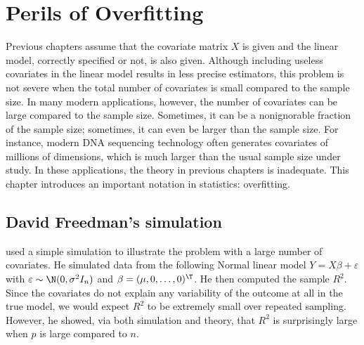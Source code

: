  
\chapter{Perils of Overfitting}
 


Previous chapters assume that the covariate matrix $X$ is given and the linear model, correctly specified or not, is also given. Although including useless covariates in the linear model results in less precise estimators, this problem is not severe when the total number of covariates is small compared to the sample size. In many modern applications, however, the number of covariates can be large compared to the sample size. Sometimes, it can be a nonignorable fraction of the sample size; sometimes, it can even be larger than the sample size. For instance, modern DNA sequencing technology often generates covariates of millions of dimensions, which is much larger than the usual sample size under study. In these applications, the theory in previous chapters is inadequate. This chapter introduces an important notation in statistics: overfitting. 



\section{David Freedman's simulation}

\citet{freedman1983note} used a simple simulation to illustrate the problem with a large number of covariates. 
He simulated data from the following Normal linear model $Y=X\beta+\varepsilon$
with $\varepsilon\sim\N(0,\sigma^{2}I_{n})$ and $\beta=(\mu,0,\ldots,0)^{\T}$. He then computed the sample $R^{2}$. Since the covariates do not explain any variability of 
the outcome at all in the true model, we would expect $R^{2}$ to be extremely small over repeated sampling. However,
he showed, via both simulation and theory, that $R^{2}$ is surprisingly
large when $p$ is large compared to $n$.


